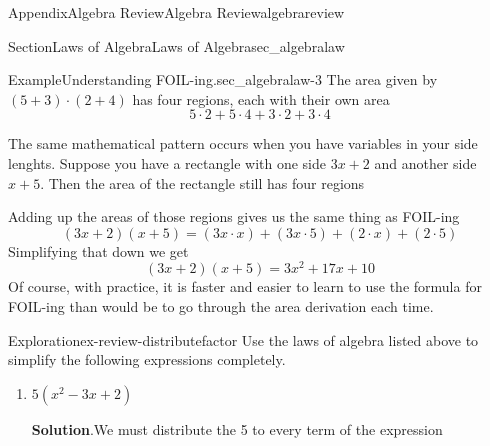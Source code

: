 \documentclass[oneside,10pt,]{tufte-book}
\newcommand{\blocktitlefont}{\relax}
\numberwithin{equation}{chapter}
\begin{document}
\begin{appendixptx}{Appendix}{Algebra Review}{}{Algebra Review}{}{}{algebrareview}
\begin{sectionptx}{Section}{Laws of Algebra}{}{Laws of Algebra}{}{}{sec_algebralaw}
\begin{example}{Example}{Understanding FOIL-ing.}{sec_algebralaw-3}
The area given by \((5+3)\cdot(2+4)\) has four regions, each with their own area%
\begin{equation*}
5\cdot 2 + 5\cdot 4 + 3 \cdot 2 + 3\cdot 4
\end{equation*}
%
\par
The same mathematical pattern occurs when you have variables in your side lenghts.  Suppose you have a rectangle with one side \(3x + 2\) and another side \(x+5\).  Then the area of the rectangle still has four regions%
\begin{image}{0.17}{0.66}{0.17}{}%
%
\end{image}%
Adding up the areas of those regions gives us the same thing as FOIL-ing%
\begin{equation*}
(3x+2)(x+5) = (3x\cdot x) + (3x\cdot 5) + (2\cdot x) + (2\cdot 5)
\end{equation*}
Simplifying that down we get%
\begin{equation*}
(3x+2)(x+5) = 3x^2 + 17x + 10
\end{equation*}
Of course, with practice, it is faster and easier to learn to use the formula for FOIL-ing than would be to go through the area derivation each time.%
\end{example}
\begin{exploration}{Exploration}{}{ex-review-distributefactor}%
Use the laws of algebra listed above to simplify the following expressions completely.%
\begin{enumerate}[font=\bfseries,label=(\alph*),ref=\alph*]%
\item{}\(5(x^2 - 3x + 2)\)%
\par\smallskip%
\noindent\textbf{\blocktitlefont Solution}.\hypertarget{ex-review-distributefactor-2-2}{}\quad{}We must distribute the 5 to every term of the expression%

\end{enumerate}
\end{exploration}
\end{sectionptx}
\end{appendixptx}
\end{document}
